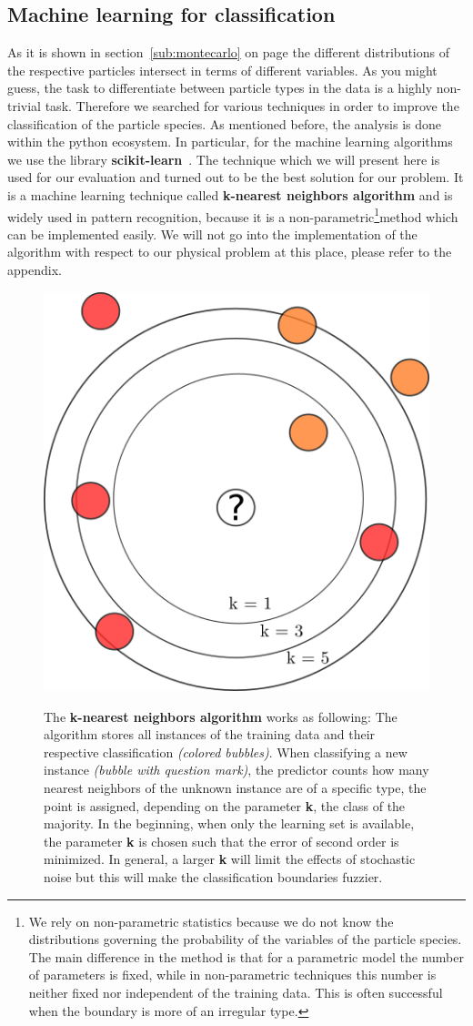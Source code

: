 \newpage
\subsection{Machine learning for classification}
As it is shown in section~\ref{sub:montecarlo} on page \pageref{sub:montecarlo} 
the different distributions of the respective particles intersect in terms of different
variables. As you might guess, the task to differentiate between particle types in the 
data is a highly non-trivial task. Therefore we searched for various techniques in order
to improve the classification of the particle species. 
As mentioned before, the analysis is done within the python
ecosystem. In particular, for the machine learning algorithms we use the library 
\textbf{scikit-learn}~\cite{scikit-learn}. 
The technique which we will present
here is used for our evaluation and turned out to be the best solution for our problem.
It is a machine learning technique called \textbf{k-nearest neighbors algorithm} and
is widely used in pattern recognition, because it is a non-parametric\footnote{
We rely on non-parametric statistics because we do not know the distributions governing
the probability of the variables of the particle species. 
The main difference in the method is that for a parametric model
the number of parameters is fixed, while in non-parametric techniques this number is 
neither fixed nor independent of the training data. This is often successful when the boundary is 
more of an irregular type.
}method which can
be implemented easily. We will not go into the implementation of the algorithm with respect to our physical problem at this
place, please refer to the appendix.
\begin{figure}
    \centering
    \caption{The \textbf{k-nearest neighbors algorithm} works as following: 
        The algorithm stores all instances of the training data and their respective
    classification \textit{(colored bubbles)}. When classifying a new instance \textit{(bubble with question mark)}, the 
    predictor counts how many nearest neighbors of the unknown instance are of a specific type, the point is assigned, 
    depending on the parameter \textbf{k}, the class of the majority. In the beginning, when only the learning set is available,
    the parameter \textbf{k} is chosen such that the error of second order is minimized. In general, a larger \textbf{k} will
    limit the effects of stochastic noise but this will make the classification boundaries fuzzier.}
    \includegraphics[width=0.5\linewidth]{figures/knn_schema}
\label{fig:knn_schema}
\end{figure}

